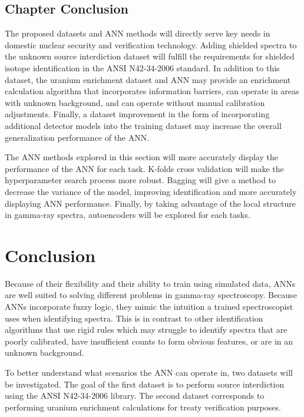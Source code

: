 \documentclass[tocnosub,noragright,centerchapter,12pt,fullpage]{uiucecethesis09}
\begin{document}
\section{Chapter Conclusion}

The proposed datasets and ANN methods will directly serve key needs in domestic nuclear security and verification technology. Adding shielded spectra to the unknown source interdiction dataset will fulfill the requirements for shielded isotope identification in the ANSI N42-34-2006 standard. In addition to this dataset, the uranium enrichment dataset and ANN may provide an enrichment calculation algorithm that incorporates information barriers, can operate in areas with unknown background, and can operate without manual calibration adjustments. Finally, a dataset improvement in the form of incorporating additional detector models into the training dataset may increase the overall generalization performance of the ANN. 

The ANN methods explored in this section will more accurately display the performance of the ANN for each task. K-folds cross validation will make the hyperparameter search process more robust. Bagging will give a method to decrease the variance of the model, improving identification and more accurately displaying ANN performance. Finally, by taking advantage of the local structure in gamma-ray spectra, autoencoders will be explored for each tasks. 



\chapter{Conclusion}

Because of their flexibility and their ability to train using simulated data, ANNs are well suited to solving different problems in gamma-ray spectroscopy. Because ANNs incorporate fuzzy logic, they mimic the intuition a trained spectroscopist uses when identifying spectra. This is in contrast to other identification algorithms that use rigid rules which may struggle to identify spectra that are poorly calibrated, have insufficient counts to form obvious features, or are in an unknown background. 

To better understand what scenarios the ANN can operate in, two datasets will be investigated. The goal of the first dataset is to perform source interdiction using the ANSI N42-34-2006 library. The second dataset corresponds to performing uranium enrichment calculations for treaty verification purposes. %
\end{document}
